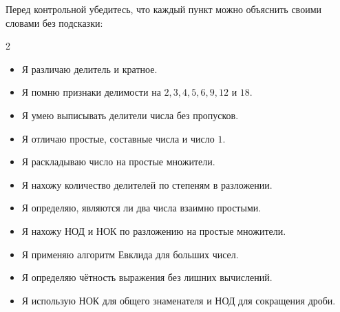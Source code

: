 \documentclass[a4paper,12pt]{article}
\newcommand{\checkitem}[1]{\item[$\square$] #1}
\begin{document}
Перед контрольной убедитесь, что каждый пункт можно объяснить своими словами без подсказки:

{\small
\begin{multicols}{2}
\begin{itemize}[leftmargin=1.7em,itemsep=0.18em,topsep=0.18em]
  \checkitem{Я различаю делитель и кратное.}
  \checkitem{Я помню признаки делимости на $2,3,4,5,6,9,12$ и $18$.}
  \checkitem{Я умею выписывать делители числа без пропусков.}
  \checkitem{Я отличаю простые, составные числа и число $1$.}
  \checkitem{Я раскладываю число на простые множители.}
  \checkitem{Я нахожу количество делителей по степеням в разложении.}
  \checkitem{Я определяю, являются ли два числа взаимно простыми.}
  \checkitem{Я нахожу НОД и НОК по разложению на простые множители.}
  \checkitem{Я применяю алгоритм Евклида для больших чисел.}
  \checkitem{Я определяю чётность выражения без лишних вычислений.}
  \checkitem{Я использую НОК для общего знаменателя и НОД для сокращения дроби.}
\end{itemize}
\end{multicols}
}
\end{document}
